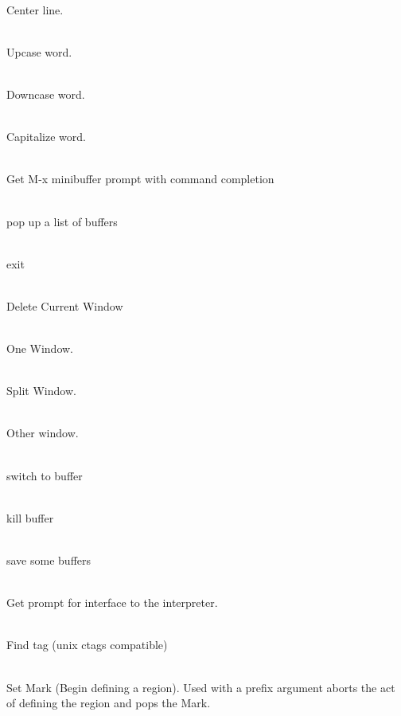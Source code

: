     \\
                Center line.
                
    \\
                Upcase word.
                
    \\
                Downcase word.
                
    \\
                Capitalize word.
                
    \\
                Get M-x minibuffer prompt with command completion
                
    \\
                pop up a list of buffers
                
    \\
                exit \jed{}
                
    \\
                Delete Current Window
                
    \\
                One Window.
                
    \\
                Split Window.
                
    \\
                Other window.
                
    \\
                switch to buffer
                
    \\
                kill buffer
                
    \\
                save some buffers
                
    \\
                Get  prompt for interface to the \slang{}
                interpreter. 
                
    \\
                Find tag (unix ctags compatible)

    \\
                Set Mark (Begin defining a region).  Used with a
                prefix argument aborts the act of defining the region and
                pops the Mark.


